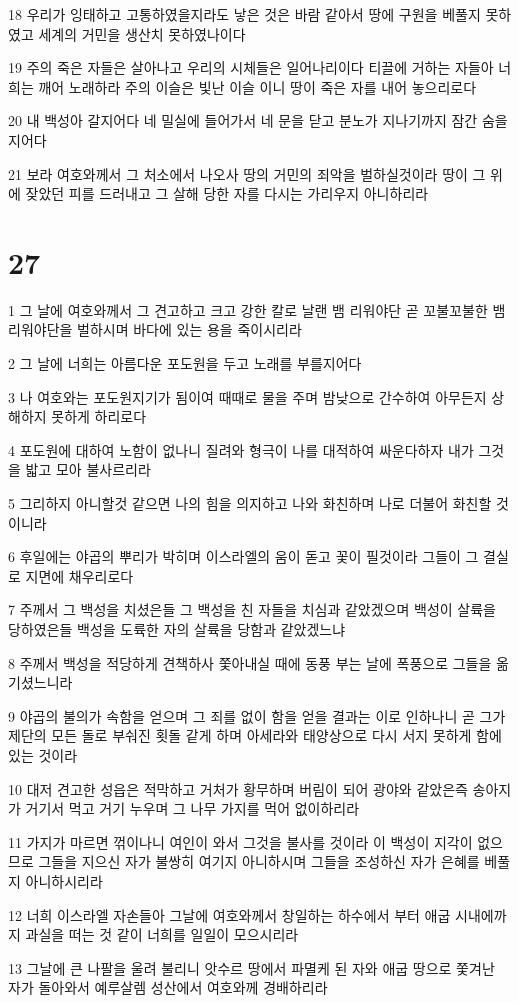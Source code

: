 \par 18 우리가 잉태하고 고통하였을지라도 낳은 것은 바람 같아서 땅에 구원을 베풀지 못하였고 세계의 거민을 생산치 못하였나이다
\par 19 주의 죽은 자들은 살아나고 우리의 시체들은 일어나리이다 티끌에 거하는 자들아 너희는 깨어 노래하라 주의 이슬은 빛난 이슬 이니 땅이 죽은 자를 내어 놓으리로다
\par 20 내 백성아 갈지어다 네 밀실에 들어가서 네 문을 닫고 분노가 지나기까지 잠간 숨을지어다
\par 21 보라 여호와께서 그 처소에서 나오사 땅의 거민의 죄악을 벌하실것이라 땅이 그 위에 잦았던 피를 드러내고 그 살해 당한 자를 다시는 가리우지 아니하리라

\chapter{27}

\par 1 그 날에 여호와께서 그 견고하고 크고 강한 칼로 날랜 뱀 리워야단 곧 꼬불꼬불한 뱀 리워야단을 벌하시며 바다에 있는 용을 죽이시리라
\par 2 그 날에 너희는 아름다운 포도원을 두고 노래를 부를지어다
\par 3 나 여호와는 포도원지기가 됨이여 때때로 물을 주며 밤낮으로 간수하여 아무든지 상해하지 못하게 하리로다
\par 4 포도원에 대하여 노함이 없나니 질려와 형극이 나를 대적하여 싸운다하자 내가 그것을 밟고 모아 불사르리라
\par 5 그리하지 아니할것 같으면 나의 힘을 의지하고 나와 화친하며 나로 더불어 화친할 것이니라
\par 6 후일에는 야곱의 뿌리가 박히며 이스라엘의 움이 돋고 꽃이 필것이라 그들이 그 결실로 지면에 채우리로다
\par 7 주께서 그 백성을 치셨은들 그 백성을 친 자들을 치심과 같았겠으며 백성이 살륙을 당하였은들 백성을 도륙한 자의 살륙을 당함과 같았겠느냐
\par 8 주께서 백성을 적당하게 견책하사 쫓아내실 때에 동풍 부는 날에 폭풍으로 그들을 옮기셨느니라
\par 9 야곱의 불의가 속함을 얻으며 그 죄를 없이 함을 얻을 결과는 이로 인하나니 곧 그가 제단의 모든 돌로 부숴진 횟돌 같게 하며 아세라와 태양상으로 다시 서지 못하게 함에 있는 것이라
\par 10 대저 견고한 성읍은 적막하고 거처가 황무하며 버림이 되어 광야와 같았은즉 송아지가 거기서 먹고 거기 누우며 그 나무 가지를 먹어 없이하리라
\par 11 가지가 마르면 꺾이나니 여인이 와서 그것을 불사를 것이라 이 백성이 지각이 없으므로 그들을 지으신 자가 불쌍히 여기지 아니하시며 그들을 조성하신 자가 은혜를 베풀지 아니하시리라
\par 12 너희 이스라엘 자손들아 그날에 여호와께서 창일하는 하수에서 부터 애굽 시내에까지 과실을 떠는 것 같이 너희를 일일이 모으시리라
\par 13 그날에 큰 나팔을 울려 불리니 앗수르 땅에서 파멸케 된 자와 애굽 땅으로 쫓겨난 자가 돌아와서 예루살렘 성산에서 여호와께 경배하리라

